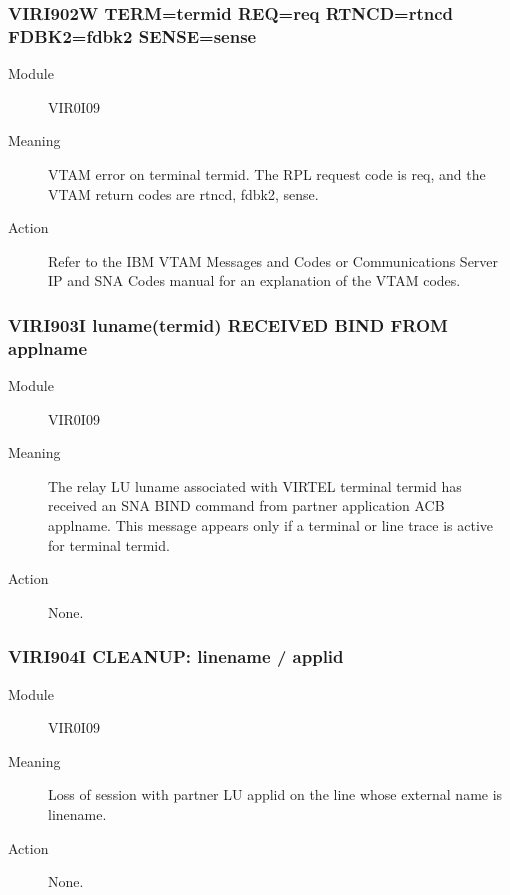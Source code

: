 \documentclass[letterpaper,10pt,english]{sphinxmanual}
\begin{document}
\subsubsection{VIRI902W TERM=termid REQ=req RTNCD=rtncd FDBK2=fdbk2 SENSE=sense}
\label{\detokenize{messages:viri902w-term-termid-req-req-rtncd-rtncd-fdbk2-fdbk2-sense-sense}}\begin{description}
\item[{Module}] \leavevmode
VIR0I09

\item[{Meaning}] \leavevmode
VTAM error on terminal termid. The RPL request code is req, and the VTAM return codes are rtncd, fdbk2, sense.

\item[{Action}] \leavevmode
Refer to the IBM VTAM Messages and Codes or Communications Server IP and SNA Codes manual for an explanation of the VTAM codes.

\end{description}


\subsubsection{VIRI903I luname(termid) RECEIVED BIND FROM applname}
\label{\detokenize{messages:viri903i-luname-termid-received-bind-from-applname}}\begin{description}
\item[{Module}] \leavevmode
VIR0I09

\item[{Meaning}] \leavevmode
The relay LU luname associated with VIRTEL terminal termid has received an SNA BIND command from partner application ACB applname. This message appears only if a terminal or line trace is active for terminal termid.

\item[{Action}] \leavevmode
None.

\end{description}


\subsubsection{VIRI904I CLEANUP: linename / applid}
\label{\detokenize{messages:viri904i-cleanup-linename-applid}}\begin{description}
\item[{Module}] \leavevmode
VIR0I09

\item[{Meaning}] \leavevmode
Loss of session with partner LU applid on the line whose external name is linename.

\item[{Action}] \leavevmode
None.

\end{description}
\end{document}

